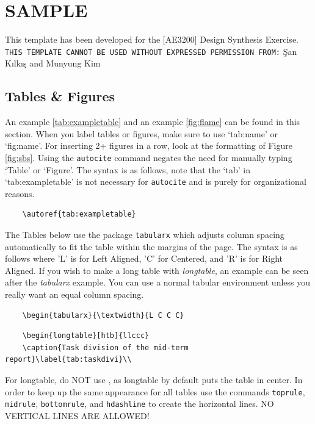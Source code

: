 \chapter{SAMPLE}

This template has been developed for the [AE3200] Design Synthesis Exercise. \texttt{THIS TEMPLATE CANNOT BE USED WITHOUT EXPRESSED PERMISSION FROM:} \c{S}an K{\i}lk{\i}\c{s} and Munyung Kim

\section{Tables \& Figures}
An example \autoref{tab:exampletable} and an example \autoref{fig:flame} can be found in this section. When you label tables or figures, make sure to use `tab:name' or `fig:name'. For inserting 2+ figures in a row, look at the formatting of Figure \autoref{fig:sbs}. Using the \texttt{autocite} command negates the need for manually typing `Table' or `Figure'. The syntax is as follows, note that the `tab' in `tab:exampletable' is not necessary for \texttt{autocite} and is purely for organizational reasons.

\begin{verbatim}
    \autoref{tab:exampletable}
\end{verbatim}

The Tables below use the package \texttt{tabularx} which adjusts column spacing automatically to fit the table within the margins of the page. The syntax is as follows where 'L' is for Left Aligned, 'C' for Centered, and 'R' is for Right Aligned. If you wish to make a long table with \textit{longtable}, an example can be seen after the \textit{tabularx} example. You can use a normal tabular environment unless you really want an equal column spacing.

\begin{verbatim}
    \begin{tabularx}{\textwidth}{L C C C}
\end{verbatim}

\begin{verbatim}
	\begin{longtable}[htb]{llccc}
	\caption{Task division of the mid-term report}\label{tab:taskdivi}\\
\end{verbatim}

For longtable, do NOT use \textit{\centering}, as longtable by default puts the table in center. In order to keep up the same appearance for all tables use the commands \texttt{toprule}, \texttt{midrule}, \texttt{bottomrule}, and \texttt{hdashline} to create the horizontal lines. NO VERTICAL LINES ARE ALLOWED!

